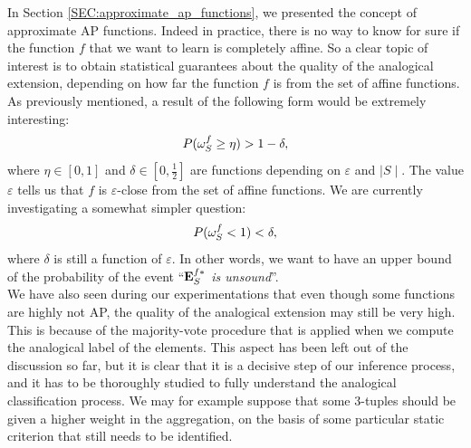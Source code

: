 In Section \ref{SEC:approximate_ap_functions}, we presented the concept of
approximate AP functions. Indeed in practice, there is no way
to know for sure if the function $f$ that we want to learn is completely
affine. So a clear topic of interest is to obtain statistical guarantees about
the quality of the analogical extension, depending on how far the function $f$
is from the set of affine functions. As previously mentioned, a result of the
following form would be extremely interesting:
$$P(\omega_{S}^{f} \geq \eta) > 1 - \delta,$$
where $\eta \in [0, 1]$ and $\delta \in [0, \frac{1}{2}]$ are functions
depending on $\varepsilon$ and $\mid S \mid$. The value $\varepsilon$ tells us that
$f$ is $\varepsilon$-close from the set of affine functions.  We are currently
investigating a somewhat simpler question:
$$P(\omega_{S}^{f} < 1) < \delta,$$
where $\delta$ is still a function of $\varepsilon$. In other words, we want to
have an upper bound of the probability of the event ``\textit{$\mathbf{E}_{S}^{f*}$ is
unsound}''.\\

We have also seen during our experimentations that even though some functions are
highly not AP, the quality of the analogical extension may still be very high.
This is because of the majority-vote procedure that is applied when we compute
the analogical label of the elements. This aspect has been left out of the
discussion so far, but it is clear that it is a decisive step of our inference
process, and it has to be thoroughly studied to fully understand the analogical
classification process. We may for example suppose that some $3$-tuples should
be given a higher weight in the aggregation, on the basis of some particular
static criterion that still needs to be identified.\\

